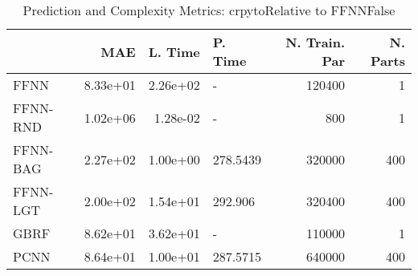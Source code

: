 \begin{table}
\centering
\caption{Prediction and Complexity Metrics: crpytoRelative to FFNNFalse}
\label{tab__crpyto__Fix_Neurons_QTrue}
\begin{tabular}{lrrlrr}
\toprule
{} &      MAE &  L. Time &   P. Time &  N. Train. Par &  N. Parts \\
\midrule
FFNN     & 8.33e+01 & 2.26e+02 &         - &         120400 &         1 \\
FFNN-RND & 1.02e+06 & 1.28e-02 &         - &            800 &         1 \\
FFNN-BAG & 2.27e+02 & 1.00e+00 &  278.5439 &         320000 &       400 \\
FFNN-LGT & 2.00e+02 & 1.54e+01 &   292.906 &         320400 &       400 \\
GBRF     & 8.62e+01 & 3.62e+01 &         - &         110000 &         1 \\
PCNN     & 8.64e+01 & 1.00e+01 &  287.5715 &         640000 &       400 \\
\bottomrule
\end{tabular}
\end{table}
